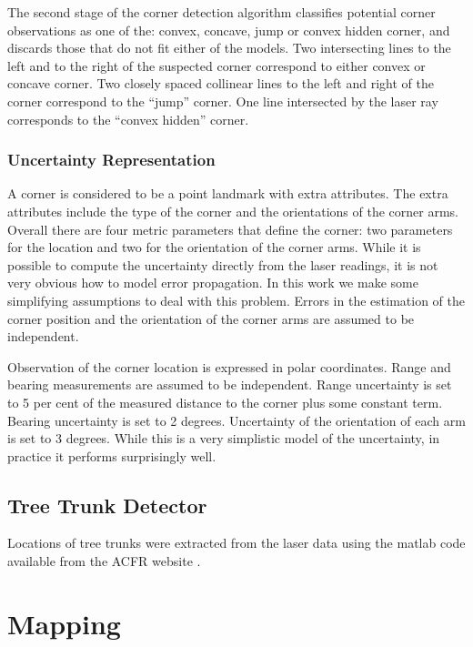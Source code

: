 The second stage of the corner detection algorithm classifies potential
corner observations as one of the: convex, concave, jump or convex
hidden corner, and discards those that do not fit either of the
models. Two intersecting lines to the left and to the right of the
suspected corner correspond to either convex or concave corner. Two
closely spaced collinear lines to the left and right of the corner
correspond to the ``jump'' corner. One line intersected by the laser
ray corresponds to the ``convex hidden'' corner.


\subsubsection{Uncertainty Representation}

A corner is considered to be a point landmark with extra attributes.
The extra attributes include the type of the corner and the
orientations of the corner arms. Overall there are four metric
parameters that define the corner: two parameters for the location and
two for the orientation of the corner arms. While it is possible to
compute the uncertainty directly from the laser readings, it is not
very obvious how to model error propagation. In this work we make some
simplifying assumptions to deal with this problem.  Errors in the
estimation of the corner position and the orientation of the corner
arms are assumed to be independent.

Observation of the corner location is expressed in polar coordinates.
Range and bearing measurements are assumed to be independent. Range
uncertainty is set to 5 per cent of the measured distance to the
corner plus some constant term.  Bearing uncertainty is set to 2
degrees. Uncertainty of the orientation of each arm is set to 3
degrees. While this is a very simplistic model of the uncertainty, in
practice it performs surprisingly well.


\subsection{Tree Trunk Detector}

Locations of tree trunks were extracted from the laser data using the
matlab code available from the ACFR website \cite{VP_dataset}.


\section{Mapping}

